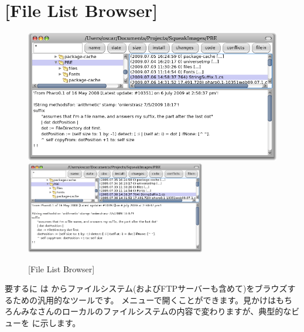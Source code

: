 \documentclass[a4paper,10pt,twoside]{book}
\begin{document}
\section{[File List Browser]}

\begin{figure}[btp]
	\begin{center}
	\ifluluelse
		{\includegraphics[width=\textwidth]{fileList}}
		{\includegraphics[width=0.7\textwidth]{fileList}}
	\end{center}
	\caption{[File List Browser]}
\end{figure}

要するに  は \pharo からファイルシステム(およびFTPサーバーも含めて)をブラウズするための汎用的なツールです。
 メニューで開くことができます。見かけはもちろんみなさんのローカルのファイルシステムの内容で変わりますが、典型的なビューを   に示します。
\end{document}
